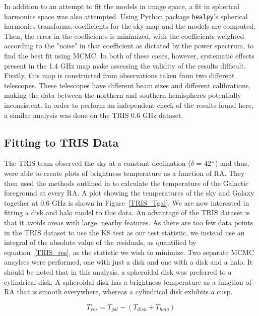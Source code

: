 \documentclass[%
onecolumn,
11pt,
tightenlines,
notitlepage,
superscriptaddress,
nofootinbib,
amsmath,amssymb,
aps,
pra,
]{revtex4-1}
\begin{document}
In addition to an attempt to fit the models in image space, a fit in spherical harmonics space was also attempted. Using Python package \texttt{healpy}'s spherical harmonics transforms, coefficients for the sky map and the models are computed. Then, the error in the coefficients is minimized, with the coefficients weighted according to the "noise" in that coefficient as dictated by the power spectrum, to find the best fit using MCMC. In both of these cases, however, systematic effects present in the 1.4 GHz map make assessing the validity of the results difficult. Firstly, this map is constructed from observations taken from two different telescopes. These telescopes have different beam sizes and different calibrations, making the data between the northern and southern hemispheres potentially inconsistent. In order to perform an independent check of the results found here, a similar analysis was done on the TRIS 0.6 GHz dataset. 

\subsection{Fitting to TRIS Data}


The TRIS team observed the sky at a constant declination ($\delta$ = 42$\degree$) and thus, were able to create plots of brightness temperature as a function of RA. They then used the methods outlined in \cite{Gervasi2008} to calculate the temperature of the Galactic foreground at every RA. A plot showing the temperatures of the sky and Galaxy together at 0.6 GHz is shown in Figure~\ref{TRIS_Tgal}. We are now interested in fitting a disk and halo model to this data. An advantage of the TRIS dataset is that it avoids areas with large, nearby features. As there are too few data points in the TRIS dataset to use the KS test as our test statistic, we instead use an integral of the absolute value of the residuals, as quantified by equation~\ref{TRIS_res}, as the statistic we wish to minimize.
Two separate MCMC anaylses were performed, one with just a disk and one with a disk and a halo. It should be noted that in this analysis, a spheroidal disk was preferred to a cylindrical disk. A spheroidal disk has a brightness temperature as a function of RA that is smooth everywhere, whereas a cylindrical disk exhibits a cusp.


\begin{equation}
T_{res} = T_{gal} - \left(T_{disk} + T_{halo}\right)
\label{TRIS_res}
\end{equation}
\end{document}
